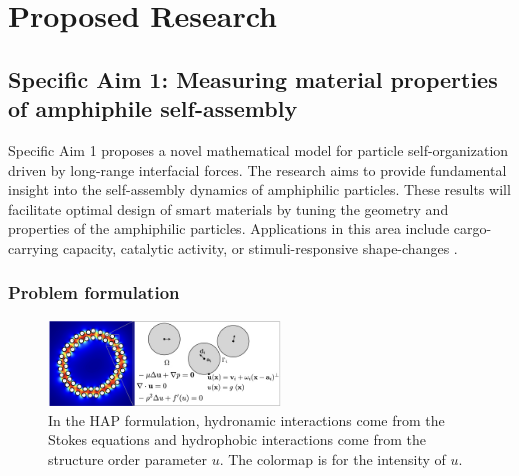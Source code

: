 \section{Proposed Research}
\label{sec:proposed-work}

\subsection{Specific Aim 1: Measuring material properties of amphiphile
  self-assembly}
\label{subsec:specific_aim_1}
Specific Aim 1 proposes a novel mathematical model for particle
self-organization driven by long-range interfacial forces. 
The research aims to provide fundamental insight into the
self-assembly dynamics of amphiphilic particles. These results will
facilitate optimal design of smart materials by tuning the geometry and
properties of the amphiphilic particles.
Applications in this area include cargo-carrying capacity, 
catalytic activity, or stimuli-responsive shape-changes
\cite{McBr21, HaBr20}.

\subsubsection{Problem formulation}
\begin{figure}
 \centering
 \vspace{-3pt}
 \includegraphics[width=0.55\textwidth]{figures/SpecificAim1/Domain.jpg}
 \caption{\label{fig:flow_map}
   In the HAP formulation, hydronamic interactions
   come from the Stokes equations and
   hydrophobic interactions come from the structure order parameter $u$.
   The colormap is for the intensity of $u$.}
\end{figure}

